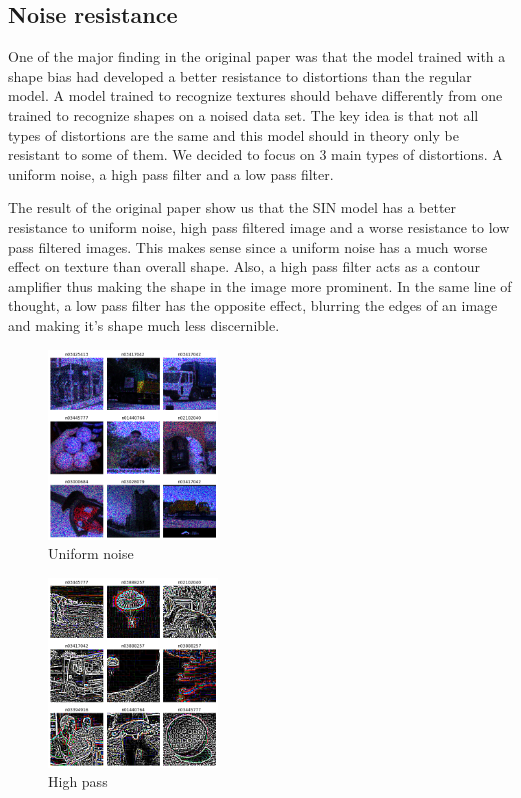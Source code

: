 \documentclass{article}
\begin{document}
\subsection{Noise resistance}


One of the major finding in the original paper was that the model trained with a 
shape bias had developed a better resistance to distortions than the regular model.
A model trained to recognize textures should behave differently from 
one trained to recognize shapes on a noised data set.  
The key idea is that not all types of distortions are the same and this model 
should in theory only be resistant to some of them.  We decided to focus on 3 main types of distortions.  
A uniform noise, a high pass filter and a low pass filter. \medskip \par

\noindent
The result of the original paper show us that the SIN model has a better resistance to uniform noise, high pass filtered image and a worse resistance to low pass filtered images.
This makes sense since a uniform noise has a much worse effect on texture than overall shape. Also, a high pass filter acts as a contour amplifier thus making the shape in the image more prominent. In the same line of thought, a low pass filter has the opposite effect, blurring the edges of an image and making it's shape much less discernible.

\begin{figure}[h!]
\centering
\includegraphics[width = 0.4\textwidth]{imgs/image_uniform}
\caption{Uniform noise}
\end{figure}

\begin{figure}[h!]
\centering
\includegraphics[width = 0.4\textwidth]{imgs/image_high}
\caption{High pass}
\end{figure}
\end{document}

